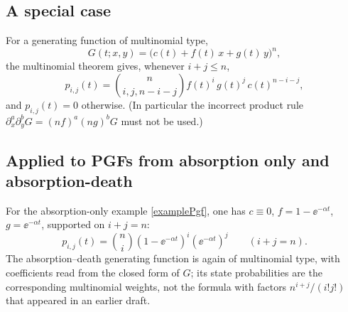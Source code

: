 \subsection*{A special case}

For a generating function of multinomial type,
\[
G(t;x,y) = \bigl(c(t) + f(t)\, x + g(t)\, y\bigr)^n,
\]
the multinomial theorem gives, whenever $i+j\leq n$,
\begin{equation}
\label{stateProbSpec2}
p_{i,j}(t)
=
\binom{n}{i,j,n-i-j}
f(t)^i\, g(t)^j\, c(t)^{n-i-j},
\end{equation}
and $p_{i,j}(t)=0$ otherwise. (In particular the incorrect product rule $\partial_x^a\partial_y^b G=(nf)^a(ng)^b G$ must not be used.)

\subsection*{Applied to PGFs from absorption only and absorption-death}
For the absorption-only example \eqref{examplePgf}, one has $c\equiv 0$, $f=1-\ee^{-\alpha t}$, $g=\ee^{-\alpha t}$, supported on $i+j=n$:
\[
p_{i,j}(t)
=
\binom{n}{i}
(1-\ee^{-\alpha t})^i
(\ee^{-\alpha t})^j
\qquad (i+j=n).
\]
The absorption--death generating function is again of multinomial type, with coefficients read from the closed form of $G$; its state probabilities are the corresponding multinomial weights, not the formula with factors $n^{i+j}/(i!j!)$ that appeared in an earlier draft.

